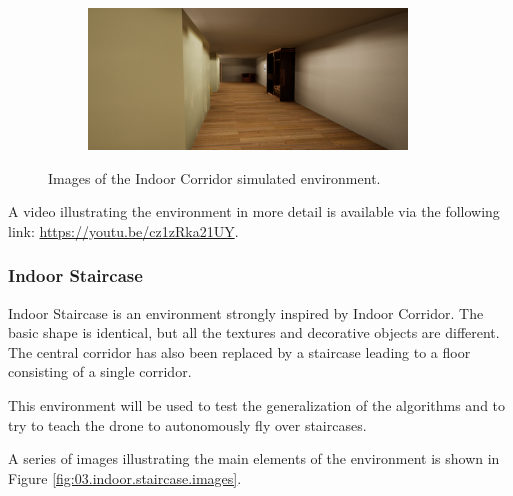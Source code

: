 \begin{figure}[H]
\begin{subfigure}[b]{0.48\textwidth}
    \end{subfigure}
    \hfill
    \begin{subfigure}[b]{0.48\textwidth}
        \centering
        \includegraphics[width=\textwidth]{resources/png/03/indoor-corridor/4.png}
    \end{subfigure}
    \caption{Images of the Indoor Corridor simulated environment.}
    \label{fig:03.indoor.corridor.images}
\end{figure}

A video illustrating the environment in more detail is available via the following link: \url{https://youtu.be/cz1zRka21UY}.

\subsubsection{Indoor Staircase}

Indoor Staircase is an environment strongly inspired by Indoor Corridor. The basic shape is identical, but all the textures and decorative objects are different. The central corridor has also been replaced by a staircase leading to a floor consisting of a single corridor.

This environment will be used to test the generalization of the algorithms and to try to teach the drone to autonomously fly over staircases.

A series of images illustrating the main elements of the environment is shown in Figure \ref{fig:03.indoor.staircase.images}.

